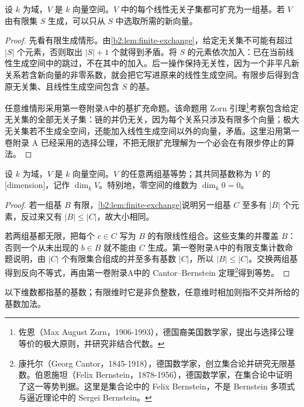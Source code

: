 \begin{theorem}[基的扩充]\label{b2:thm:vector-basis-extension}
	设 \(k\) 为域，\(V\) 是 \(k\) 向量空间。\(V\) 中的每个线性无关子集都可扩充为一组基。若 \(V\) 由有限集 \(S\) 生成，可以只从 \(S\) 中选取所需的新向量。
\end{theorem}
\begin{proof}
	先看有限生成情形。由\cref{b2:lem:finite-exchange}，给定无关集不可能有超过 \(|S|\) 个元素，否则取出 \(|S|+1\) 个就得到矛盾。将 \(S\) 的元素依次加入：已在当前线性生成空间中的跳过，不在其中的加入。后一操作保持无关性，因为一个非平凡新关系若含新向量的非零系数，就会把它写进原来的线性生成空间。有限步后得到含原无关集、且线性生成空间包含 \(S\) 的基。

	任意维情形采用第一卷附录A中的基扩充命题。该命题用 Zorn 引理\footnote{佐恩（Max August Zorn，1906-1993），德国裔美国数学家，提出与选择公理等价的极大原则，并研究非结合代数。}考察包含给定无关集的全部无关子集：链的并仍无关，因为每个关系只涉及有限多个向量；极大无关集若不生成全空间，还能加入线性生成空间以外的向量，矛盾。这里沿用第一卷附录 A 已经采用的选择公理，不把无限扩充理解为一个必会在有限步停止的算法。
\end{proof}

\begin{theorem}[维数不变性]\label{b2:thm:vector-dimension}
	设 \(k\) 为域，\(V\) 是 \(k\) 向量空间。\(V\) 的任意两组基等势；其共同基数称为 \(V\) 的[dimension]，记作 \(\dim_kV\)。特别地，零空间的维数为 \(\dim_k0=0\)。
\end{theorem}
\begin{proof}
	若一组基 \(B\) 有限，\cref{b2:lem:finite-exchange}说明另一组基 \(C\) 至多有 \(|B|\) 个元素，反过来又有 \(|B|\le|C|\)，故大小相同。

	若两组基都无限，把每个 \(c\in C\) 写为 \(B\) 的有限线性组合。这些支集的并覆盖 \(B\)：否则一个从未出现的 \(b\in B\) 就不能由 \(C\) 生成。第一卷附录A中的有限支集计数命题说明，由 \(|C|\) 个有限集合组成的并至多有基数 \(|C|\)，所以 \(|B|\le|C|\)。交换两组基得到反向不等式，再由第一卷附录A中的 Cantor--Bernstein 定理\footnote{康托尔（Georg Cantor，1845-1918），德国数学家，创立集合论并研究无限基数。伯恩施坦（Felix Bernstein，1878-1956），德国数学家，在集合论中证明了这一等势判据。这里是集合论中的 Felix Bernstein，不是 Bernstein 多项式与逼近理论中的 Sergei Bernstein。}得到等势。
\end{proof}

以下维数都指基的基数；有限维时它是非负整数，任意维时相加则指不交并所给的基数加法。

